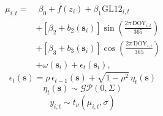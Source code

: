 \documentclass{article}
\begin{document}
 
\begin{equation} \begin{split} \mu_{i,t} =&\; \beta_0 + f(z_{i}) + \beta_1 \mathrm{GL12}_{i,t} \\ &+ \left[\beta_2+b_2(\mathbf{s}_i)\right] \sin\!\left(\frac{2\pi\,\mathrm{DOY}_{i,t}}{365}\right) \\ &+ \left[\beta_3+b_3(\mathbf{s}_i)\right] \cos\!\left(\frac{2\pi\,\mathrm{DOY}_{i,t}}{365}\right) \\ &+ \omega(\mathbf{s}_i) + \epsilon_t(\mathbf{s}_i), \end{split} \end{equation}
 \begin{equation*} 
  		\epsilon_t(\mathbf{s}) = \rho \, \epsilon_{t-1}(\mathbf{s}) + \sqrt{1-\rho^2}\,\eta_t(\mathbf{s}) 
  \end{equation*} 
  \begin{equation*} 
  		\eta_t(\mathbf{s}) \sim \mathcal{GP}\!\left(0,\Sigma\right) 
  \end{equation*} 
  \begin{equation*} 
  		y_{i,t} \sim t_{\nu}(\mu_{i,t},\sigma) 
  \end{equation*}
\end{document}
